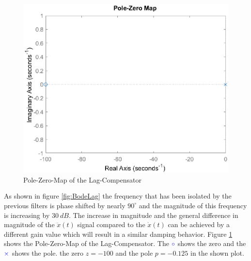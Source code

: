 \begin{figure}[tbh]
	\centering	
	\includegraphics[width=12cm]{Figures/PoleZeroMapLagCompensator.eps}
	\caption{Pole-Zero-Map of the Lag-Compensator}
	\label{fig:ZeroPoleLag}
\end{figure} 
As shown in figure \ref{fig:BodeLag} the frequency that has been isolated by the previous filters is phase shifted by nearly $90^{\circ}$ and the magnitude of this frequency is increasing by $\SI{30}{dB}$. The increase in magnitude and the general difference in magnitude of the $\ddot{x}(t)$ signal compared to the $\dot{x}(t)$ can be achieved by a different gain value which will result in a similar damping behavior. Figure \ref{fig:ZeroPoleLag} shows the Pole-Zero-Map of the Lag-Compensator. The $\color{blue} \circ$ shows the zero and the $\color{blue} \times$ shows the pole. the zero $z = -100$ and the pole $p = -0.125$ in the shown plot.

